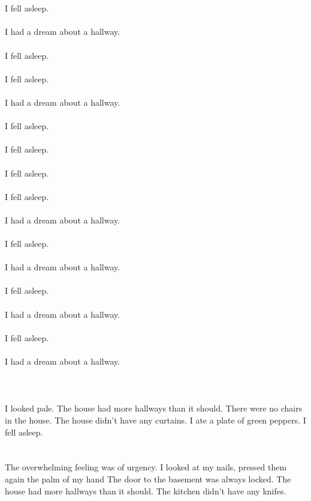 \documentclass{article}
\begin{document}
    \section{}
    I fell asleep.\\\\I had a dream about a hallway.\\\\ I fell asleep.\\\\ I fell asleep.\\\\I had a dream about a hallway.\\\\ I fell asleep.\\\\ I fell asleep.\\\\ I fell asleep.\\\\ I fell asleep.\\\\I had a dream about a hallway.\\\\ I fell asleep.\\\\I had a dream about a hallway.\\\\ I fell asleep.\\\\I had a dream about a hallway.\\\\ I fell asleep.\\\\I had a dream about a hallway.\\\\ 
    \newpage
    
    \section{}
    I looked pale. The house had more hallways than it should. There were no chairs in the house. The house didn't have any curtains. I ate a plate of green peppers. I fell asleep.  
    \newpage
    
    \section{}
    The overwhelming feeling was of urgency. I looked at my nails, pressed them again the palm of my hand The door to the basement was always locked. The house had more hallways than it should. The kitchen didn't have any knifes.  
    \newpage
    
\end{document}
